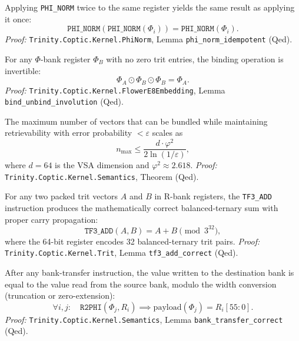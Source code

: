 \begin{theorem}
\label{thm:phi-norm-idem}
Applying \texttt{PHI\_NORM} twice to the same register yields
the same result as applying it once:
\[
\texttt{PHI\_NORM}(\texttt{PHI\_NORM}(\Phi_i)) = \texttt{PHI\_NORM}(\Phi_i).
\]
\emph{Proof:} \texttt{Trinity.Coptic.Kernel.PhiNorm}, Lemma
\texttt{phi\_norm\_idempotent} (Qed).
\end{theorem}

\begin{theorem}
\label{thm:vsa-bind-invert}
For any $\Phi$-bank register $\Phi_B$ with no zero trit entries,
the binding operation is invertible:
\[
\Phi_A \odot \Phi_B \odot \Phi_B = \Phi_A.
\]
\emph{Proof:} \texttt{Trinity.Coptic.Kernel.FlowerE8Embedding},
Lemma \texttt{bind\_unbind\_involution} (Qed).
\end{theorem}

\begin{theorem}
\label{thm:bundle-cap}
The maximum number of vectors that can be bundled while
maintaining retrievability with error probability $< \varepsilon$
scales as
\[
n_{\max} \leq \frac{d \cdot \varphi^2}{2 \ln(1/\varepsilon)},
\]
where $d = 64$ is the VSA dimension and
\(\varphi^2 \approx 2.618\).
\emph{Proof:} \texttt{Trinity.Coptic.Kernel.Semantics},
Theorem  (Qed).
\end{theorem}

\begin{theorem}
\label{thm:tf3-add}
For any two packed trit vectors $A$ and $B$ in R-bank registers,
the \texttt{TF3\_ADD} instruction produces the mathematically
correct balanced-ternary sum with proper carry propagation:
\[
\texttt{TF3\_ADD}(A, B) = A + B \pmod{3^{32}},
\]
where the 64-bit register encodes 32 balanced-ternary trit pairs.
\emph{Proof:} \texttt{Trinity.Coptic.Kernel.Trit}, Lemma
\texttt{tf3\_add\_correct} (Qed).
\end{theorem}

\begin{theorem}
\label{thm:bank-consistency}
After any bank-transfer instruction, the value written to the
destination bank is equal to the value read from the source bank,
modulo the width conversion (truncation or zero-extension):
\[
\forall i, j: \quad \texttt{R2PHI}(\Phi_j, R_i) \implies \text{payload}(\Phi_j) = R_i[55:0].
\]
\emph{Proof:} \texttt{Trinity.Coptic.Kernel.Semantics}, Lemma
\texttt{bank\_transfer\_correct} (Qed).
\end{theorem}

